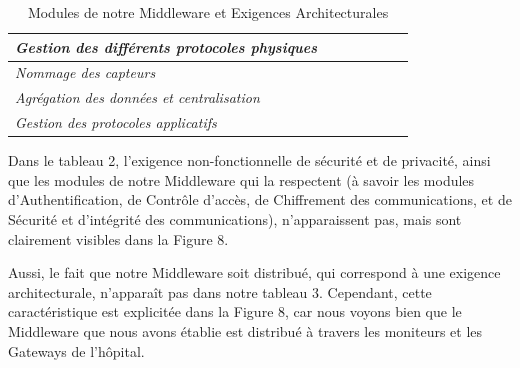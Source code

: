 \begin{table}[h!]
\begin{tabular}{|l|c|c|c|c|c|c|}
		\textit{Gestion des différents protocoles physiques} &                                                                                       & \checkmark                &                                                                            & \checkmark            &                                                                   &                    \\ \hline
		\textit{Nommage des capteurs}                        &                                                                                       & \checkmark                &                                                                            & \checkmark            &                                                                   &                    \\ \hline
		\textit{Agrégation des données et centralisation}    &                                                                                       & \checkmark                &                                                                            & \checkmark            & \checkmark                                                        &                    \\ \hline
		\textit{Gestion des protocoles applicatifs}          &                                                                                       & \checkmark                &                                                                            & \checkmark            &                                                                   &                    \\ \hline
	\end{tabular}
	\caption{Modules de notre Middleware et Exigences Architecturales}
\end{table}

Dans le tableau 2, l'exigence non-fonctionnelle de sécurité et de privacité, ainsi que les modules de notre Middleware qui la respectent (à savoir les modules d'Authentification, de Contrôle d'accès, de Chiffrement des communications, et de Sécurité et d'intégrité des communications), n'apparaissent pas, mais sont clairement visibles dans la Figure 8. 

Aussi, le fait que notre Middleware soit distribué, qui correspond à une exigence architecturale, n'apparaît pas dans notre tableau 3. Cependant, cette caractéristique est explicitée dans la Figure 8, car nous voyons bien que le Middleware que nous avons établie est distribué à travers les moniteurs et les Gateways de l'hôpital.

